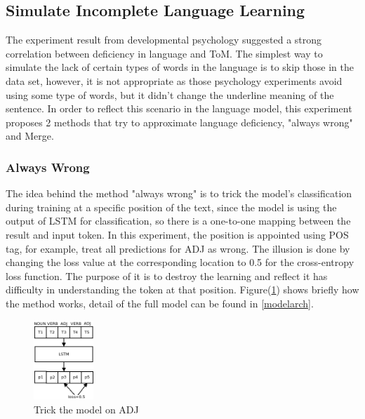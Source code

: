 \documentclass[12pt]{article}
\begin{document}
\subsection{Simulate Incomplete Language Learning} \label{incomplearning}
The experiment result from developmental psychology suggested a strong correlation between deficiency in language and ToM. The simplest way to simulate the lack of certain types of words in the language is to skip those in the data set, however, it is not appropriate as those psychology experiments avoid using some type of words, but it didn't change the underline meaning of the sentence.    
In order to reflect this scenario in the language model, this experiment proposes 2 methods that try to approximate language deficiency, "always wrong" and Merge. 

\subsubsection{Always Wrong}
The idea behind the method "always wrong" is to trick the model's classification during training at a specific position of the text, since the model is using the output of LSTM for classification, so there is a one-to-one mapping between the result and input token. In this experiment, the position is appointed using POS tag, for example, treat all predictions for ADJ as wrong. The illusion is done by changing the loss value at the corresponding location to 0.5 for the cross-entropy loss function. The purpose of it is to destroy the learning and reflect it has difficulty in understanding the token at that position. Figure(\ref{fig:alwayswrong}) shows briefly how the method works, detail of the full model can be found in \ref{modelarch}.
\begin{figure} [!h]
\begin{center}
\includegraphics[width=0.2\textwidth]{figures/alwayswrong.png}
\caption{Trick the model on ADJ}
\label{fig:alwayswrong}
\end{center}
\end{figure}
\end{document}

